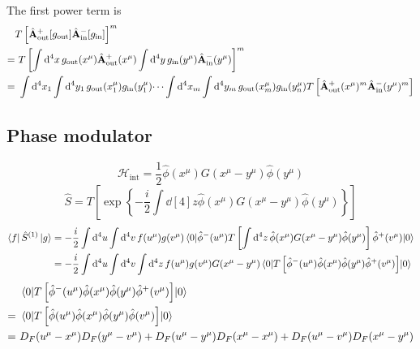 The first power term is
\begin{equation*}
	\begin{split}
		&
		T\left[
			\hat{\vb{A}}_\text{out}^+[g_\text{out}]
			\hat{\vb{A}}_\text{in}^-[g_\text{in}]
		\right]^m
		\\
		=&\
		T\left[
			\int\dd[4]{x}
			g_\text{out}(x^\mu)
			\hat{\vb{A}}_\text{out}^+(x^\mu)
			\int\dd[4]{y}
			g_\text{in}(y^\mu)
			\hat{\vb{A}}_\text{in}^-(y^\mu)
		\right]^m
		\\
		=&\
		\int\dd[4]{x_1}
		\int\dd[4]{y_1}
		g_\text{out}(x^\mu_1)
		g_\text{in}(y^\mu_1)
		\dots
		\int\dd[4]{x_m}
		\int\dd[4]{y_m}
		g_\text{out}(x^\mu_m)
		g_\text{in}(y^\mu_n)
		T\left[
			\hat{\vb{A}}_\text{out}^+(x^\mu)^m
			\hat{\vb{A}}_\text{in}^-(y^\mu)^m
		\right]
	\end{split}
\end{equation*}

\subsection{Phase modulator}

\begin{equation*}
	\mathcal{H}_\text{int}
	=
	\frac{1}{2}
	\hat\phi(x^\mu)
	G(x^\mu-y^\mu)
	\hat\phi(y^\mu)
\end{equation*}
\begin{equation*}
	\hat{S}
	=
	T\left[
		\exp\left\{
			-\frac{i}{2}
			\int\dd[4]{z}
			\hat\phi(x^\mu)
			G(x^\mu-y^\mu)
			\hat\phi(y^\mu)
		\right\}
	\right]
\end{equation*}
\begin{equation*}
	\begin{split}
		\bra{f}
		\hat{S}^{(1)}
		\ket{g}
		&=
		-
		\frac{i}{2}
		\int\dd[4]{u}
		\int\dd[4]{v}
		f(u^\mu)
		g(v^\mu)
		\expval{
			\hat\phi^-(u^\mu)
			T\left[
				\int\dd[4]{z}
				\hat\phi(x^\mu)
				G(x^\mu-y^\mu)
				\hat\phi(y^\mu)
			\right]
			\hat\phi^+(v^\mu)
		}{0}
		\\
		&=
		-
		\frac{i}{2}
		\int\dd[4]{u}
		\int\dd[4]{v}
		\int\dd[4]{z}
		f(u^\mu)
		g(v^\mu)
		G(x^\mu-y^\mu)
		\expval{
			T\left[
				\hat\phi^-(u^\mu)
				\hat\phi(x^\mu)
				\hat\phi(y^\mu)
				\hat\phi^+(v^\mu)
			\right]
		}{0}
	\end{split}
\end{equation*}
\begin{equation*}
	\begin{split}
		&\
		\expval{
			T\left[
				\hat\phi^-(u^\mu)
				\hat\phi(x^\mu)
				\hat\phi(y^\mu)
				\hat\phi^+(v^\mu)
			\right]
		}{0}
		\\
		=&\
		\expval{
			T\left[
				\hat\phi(u^\mu)
				\hat\phi(x^\mu)
				\hat\phi(y^\mu)
				\hat\phi(v^\mu)
			\right]
		}{0}
		\\
		=&\
		D_F(u^\mu-x^\mu)
		D_F(y^\mu-v^\mu)
		+
		D_F(u^\mu-y^\mu)
		D_F(x^\mu-x^\mu)
		+
		D_F(u^\mu-v^\mu)
		D_F(x^\mu-y^\mu)
	\end{split}
\end{equation*}